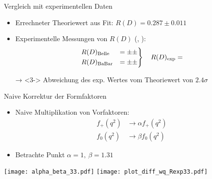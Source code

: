 \documentclass[fleqn, aspectratio=1610, professionalfonts, 9pt]{beamer}
\begin{document}
\begin{frame}{Vergleich mit experimentellen Daten}
  \begin{itemize}
    \setlength\itemsep{1em}
    \item<1-> Errechneter Theoriewert aus Fit: $R(D) = \num{0.287} \pm \num{0.011}$
    \item<2-> Experimentelle Messungen von $R(D)$ (\cite{PhysRevD.92.072014}, \cite{PhysRevLett.109.101802}):
    \begin{align*}
      \begin{drcases}
        R(D)_\text{Belle} &=  \pm  \pm  \\
        R(D)_\text{BaBar} &=  \pm  \pm 
      \end{drcases}
      \quad R(D)_\text{exp} = 
    \end{align*}
    \item[→]<3-> Abweichung des exp. Wertes vom Theoriewert von $\num{2.4}\sigma$
  \end{itemize}
\end{frame}


\begin{frame}{Naive Korrektur der Formfaktoren}
  \begin{minipage}{6cm}
    \begin{itemize}
      \setlength\itemsep{2em}
      \item<2-> Naive Multiplikation von Vorfaktoren:
      \begin{align*}
        f_+(q^2) &\to \alpha f_+(q^2)\\ f_0(q^2) &\to \beta f_0(q^2)
      \end{align*}
      \item<4-> Betrachte Punkt $\alpha = \num{1}, \: \beta = \num{1.31}$
    \end{itemize}
  \end{minipage}
  \begin{minipage}{8.5cm}
    \begin{overprint}
      \texttt{[image: alpha\_beta\_33.pdf]}
      \texttt{[image: plot\_diff\_wq\_Rexp33.pdf]}
    \end{overprint}
  \end{minipage}%
\end{frame}
\end{document}
